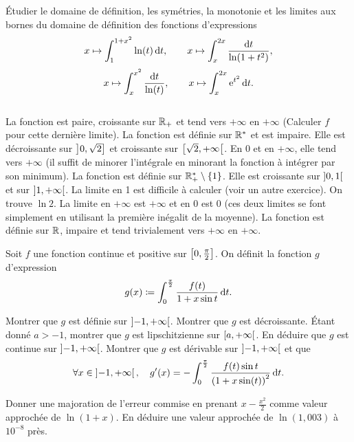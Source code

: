 \documentclass{magnolia}
\begin{document}
Étudier le domaine de définition, les symétries, la monotonie et les limites
aux bornes du domaine de définition des fonctions d'expressions
\[x\mapsto \integ{1}{1+x^2}{\ln(t)}{t}, \qquad
  x\mapsto \integinv{x}{2x}{\ln(1+t^2)}{t},\]
\[x\mapsto \integinv{x}{x^2}{\ln(t)}{t}, \qquad
  x\mapsto \integ{x}{2x}{\e^{t^2}}{t}.\]
\begin{sol}
$\quad$
\begin{questions}
\question La fonction est paire, croissante sur $\RP$ et tend vers $+\infty$
  en $+\infty$ (Calculer $f$ pour cette dernière limite).
\question La fonction est définie sur $\Rs$ et est impaire. Elle
  est décroissante sur $\interof{0}{\sqrt{2}}$ et croissante sur
  $\interfo{\sqrt{2}}{+\infty}$. En 0 et en $+\infty$, elle tend vers $+\infty$
  (il suffit de minorer l'intégrale en minorant la fonction à intégrer
  par son minimum).
\question La fonction est définie sur $\RPs\setminus\ens{1}$. Elle est
  croissante sur $\intero{0}{1}$ et sur $\intero{1}{+\infty}$. La limite en
  1 est difficile à calculer (voir un autre exercice). On trouve $\ln 2$.
  La limite en $+\infty$ est $+\infty$ et en 0 est 0 (ces deux limites
  se font simplement en utilisant la première inégalit de la moyenne).
\question La fonction est définie sur $\R$, impaire et tend trivialement vers
  $+\infty$ en $+\infty$.
\end{questions}
\end{sol}

Soit $f$ une fonction continue et positive sur $\interf{0}{\frac{\pi}{2}}$. On
définit la fonction $g$ d'expression
$$g(x)\defeq\integ{0}{\frac{\pi}{2}}{\frac{f(t)}{1+x\sin t}}{t}.$$
\begin{questions}
\question Montrer que $g$ est définie sur $\intero{-1}{+\infty}$.
\question Montrer que $g$ est décroissante.
\question Étant donné $a>-1$, montrer que $g$ est lipschitzienne sur
  $\interfo{a}{+\infty}$. En déduire que $g$ est continue sur
  $\intero{-1}{+\infty}$.
\question Montrer que $g$ est dérivable sur $\intero{-1}{+\infty}$ et que
  \[\forall x\in\intero{-1}{+\infty} \qsep
    g'(x)=
    -\integ{0}{\frac{\pi}{2}}{\frac{f(t)\sin t}{\p{1+x\sin(t)}^2}}{t}.\]
\end{questions}


Donner une majoration de l'erreur commise en prenant $x-\frac{x^2}{2}$
comme valeur approchée de $\ln(1+x)$. En déduire une valeur approchée de
$\ln(1,003)$ à $10^{-8}$ près.
\end{document}
